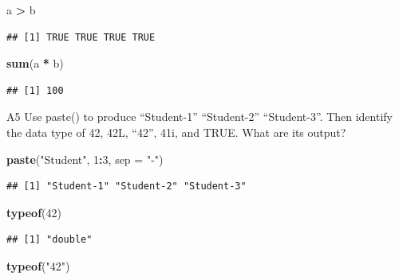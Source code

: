 \documentclass[
]{article}
\newenvironment{Shaded}{\begin{snugshade}}{\end{snugshade}}
\newcommand{\AttributeTok}[1]{\textcolor[rgb]{0.13,0.29,0.53}{#1}}
\newcommand{\DecValTok}[1]{\textcolor[rgb]{0.00,0.00,0.81}{#1}}
\newcommand{\FunctionTok}[1]{\textcolor[rgb]{0.13,0.29,0.53}{\textbf{#1}}}
\newcommand{\NormalTok}[1]{#1}
\newcommand{\SpecialCharTok}[1]{\textcolor[rgb]{0.81,0.36,0.00}{\textbf{#1}}}
\newcommand{\StringTok}[1]{\textcolor[rgb]{0.31,0.60,0.02}{#1}}
\begin{document}
\begin{Shaded}
\begin{Highlighting}[]
\NormalTok{a }\SpecialCharTok{\textgreater{}}\NormalTok{ b}
\end{Highlighting}
\end{Shaded}

\begin{verbatim}
## [1] TRUE TRUE TRUE TRUE
\end{verbatim}

\begin{Shaded}
\begin{Highlighting}[]
\FunctionTok{sum}\NormalTok{(a }\SpecialCharTok{*}\NormalTok{ b)}
\end{Highlighting}
\end{Shaded}

\begin{verbatim}
## [1] 100
\end{verbatim}

A5 Use paste() to produce ``Student-1'' ``Student-2'' ``Student-3''.
Then identify the data type of 42, 42L, ``42'', 41i, and TRUE. What are
its output?

\begin{Shaded}
\begin{Highlighting}[]
\FunctionTok{paste}\NormalTok{(}\StringTok{"Student"}\NormalTok{, }\DecValTok{1}\SpecialCharTok{:}\DecValTok{3}\NormalTok{, }\AttributeTok{sep =} \StringTok{"{-}"}\NormalTok{)}
\end{Highlighting}
\end{Shaded}

\begin{verbatim}
## [1] "Student-1" "Student-2" "Student-3"
\end{verbatim}

\begin{Shaded}
\begin{Highlighting}[]
\FunctionTok{typeof}\NormalTok{(}\DecValTok{42}\NormalTok{)}
\end{Highlighting}
\end{Shaded}

\begin{verbatim}
## [1] "double"
\end{verbatim}

\begin{Shaded}
\begin{Highlighting}[]
\FunctionTok{typeof}\NormalTok{(}\StringTok{"42"}\NormalTok{)}
\end{Highlighting}
\end{Shaded}
\end{document}
